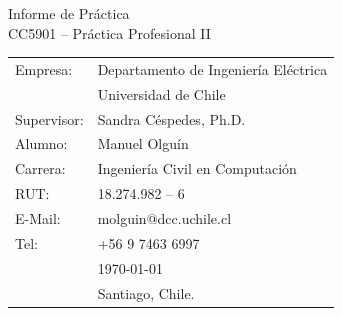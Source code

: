 \documentclass[11pt,letterpaper]{article}
\begin{document}
\newpage
\pagestyle{fancy}
\fancyhf{}
\vspace*{6cm}
\begin{center}
\Huge  {Informe de Práctica}\\
\vspace{1cm}
\small {CC5901 -- Práctica Profesional II}\\
\end{center}
\vfill
\begin{flushright}
\begin{tabular}{ll}
Empresa: & Departamento de Ingeniería Eléctrica\\
        & Universidad de Chile \\
Supervisor: & Sandra Céspedes, Ph.D.\\
Alumno: & Manuel Olguín\\
Carrera: & Ingeniería Civil en Computación\\
RUT:& 18.274.982 -- 6\\
E-Mail: & molguin@dcc.uchile.cl\\
Tel: & +56 9 7463 6997\\
& \today\\
& Santiago, Chile.
\end{tabular}
\end{flushright}

\newpage
\pagestyle{fancy}
\fancyhf{}


\fancyfoot[R]{\small \rm \textbf{\thepage}} %
\end{document}
